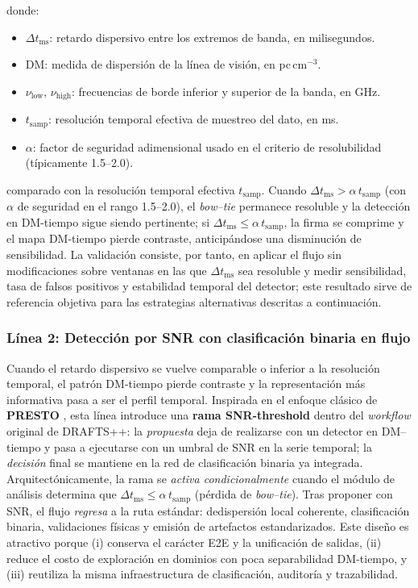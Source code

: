 \noindent donde:
\begin{itemize}
    \item $\Delta t_{\mathrm{ms}}$: retardo dispersivo entre los extremos de banda, en milisegundos.
    \item $\mathrm{DM}$: medida de dispersión de la línea de visión, en pc\,cm$^{-3}$.
    \item $\nu_{\mathrm{low}}, \, \nu_{\mathrm{high}}$: frecuencias de borde inferior y superior de la banda, en GHz.
    \item $t_{\mathrm{samp}}$: resolución temporal efectiva de muestreo del dato, en ms.
    \item $\alpha$: factor de seguridad adimensional usado en el criterio de resolubilidad (típicamente 1.5--2.0).
\end{itemize}
comparado con la resolución temporal efectiva $t_{\mathrm{samp}}$. Cuando $\Delta t_{\mathrm{ms}} > \alpha\, t_{\mathrm{samp}}$ (con $\alpha$ de seguridad en el rango 1.5–2.0), el \textit{bow–tie} permanece resoluble y la detección en DM-tiempo sigue siendo pertinente; si $\Delta t_{\mathrm{ms}} \le \alpha\, t_{\mathrm{samp}}$, la firma se comprime y el mapa DM-tiempo pierde contraste, anticipándose una disminución de sensibilidad. La validación consiste, por tanto, en aplicar el flujo sin modificaciones sobre ventanas en las que $\Delta t_{\mathrm{ms}}$ sea resoluble y medir sensibilidad, tasa de falsos positivos y estabilidad temporal del detector; este resultado sirve de referencia objetiva para las estrategias alternativas descritas a continuación.


\subsubsection{Línea 2: Detección por SNR con clasificación binaria en flujo}

Cuando el retardo dispersivo se vuelve comparable o inferior a la resolución temporal, el patrón DM-tiempo pierde contraste y la representación más informativa pasa a ser el perfil temporal. Inspirada en el enfoque clásico de \textbf{PRESTO} \cite{2011ascl.soft07017R}, esta línea introduce una \textbf{rama SNR-threshold} dentro del \emph{workflow} original de DRAFTS++: la \textit{propuesta} deja de realizarse con un detector en DM–tiempo y pasa a ejecutarse con un umbral de SNR en la serie temporal; la \textit{decisión} final se mantiene en la red de clasificación binaria ya integrada. Arquitectónicamente, la rama se \textit{activa condicionalmente} cuando el módulo de análisis determina que $\Delta t_{\mathrm{ms}} \le \alpha\, t_{\mathrm{samp}}$ (pérdida de \textit{bow–tie}). Tras proponer con SNR, el flujo \textit{regresa} a la ruta estándar: dedispersión local coherente, clasificación binaria, validaciones físicas y emisión de artefactos estandarizados. Este diseño es atractivo porque (i) conserva el carácter E2E y la unificación de salidas, (ii) reduce el costo de exploración en dominios con poca separabilidad DM-tiempo, y (iii) reutiliza la misma infraestructura de clasificación, auditoría y trazabilidad.

